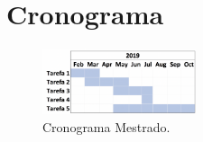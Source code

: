 \section{Cronograma}
\label{sec:cronograma}


\begin{figure}
  \centering
  \includegraphics[width=0.4\textwidth]{figures/cronograma.png}
  \caption{Cronograma Mestrado.}
  \label{fig:cronograma}
\end{figure}
